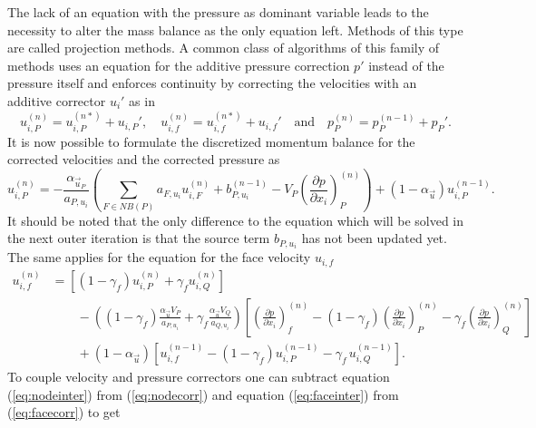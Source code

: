   The lack of an equation with the pressure as dominant variable leads to the necessity to alter the mass balance as the only equation left. Methods of this type are called projection methods. A common class of algorithms of this family of methods uses an equation for the additive pressure correction \(p'\) instead of the pressure itself and enforces continuity by correcting the velocities with an additive corrector \(u_i'\) as in
  \begin{displaymath}
    u_{i,P}^{(n)} =  u_{i,P}^{(n*)}  + u_{i,P}',\quad u_{i,f}^{(n)} =  u_{i,f}^{(n*)}  + u_{i,f}' \quad \text{and} \quad   p_P^{(n)} =  p_P^{(n-1)}  + p_P'.
  \end{displaymath}
  It is now possible to formulate the discretized momentum balance for the corrected velocities and the corrected pressure as
  \begin{equation}
    \label{eq:nodecorr}
    u_{i,P}^{(n)} 
    = 
    - \frac{\alpha_{\vec{u}_P}}{a_{P,u_i}} \left(\sum_{F \in NB(P)} a_{F,u_i} u_{i,F}^{(n)}
    +                                     b_{P,u_i}^{(n-1)} 
    -                                     V_P\left(\frac{\partial p}{\partial x_i}\right)_P^{(n)} \right)
    + \left(1 - \alpha_{\vec{u}}\right) u_{i,P}^{(n-1)}  .
  \end{equation}
  It should be noted that the only difference to the equation which will be solved in the next outer iteration is that the source term \(b_{P,u_i}\) has not been updated yet. The same applies for the equation for the face velocity \(u_{i,f}\)
  \begin{align}
    \label{eq:facecorr}
    u_{i,f}^{(n)} 
    &=
    \left[\left(1 - \gamma_f\right) u_{i,P}^{(n)} + \gamma_f u_{i,Q}^{(n)} \right] \nonumber\\[1em]
    &\quad\quad - 
    \left(\left(1 - \gamma_f\right) \frac{\alpha_\vec{u} V_P}{a_{P,u_i}} + \gamma_f \frac{\alpha_\vec{u} V_Q}{a_{Q,u_i}}\right)
    \left[ 
    \left(\frac{\partial p}{\partial x_i}\right)_f^{(n)} 
    -  \left(1 - \gamma_f\right) \left( \frac{\partial p}{\partial x_i} \right)_P^{(n)} 
    - \gamma_f \left(\frac{\partial p}{\partial x_i}\right)_Q^{(n)} 
    \right] \nonumber \\[1em]
    &\quad\quad + \left(1 - \alpha_\vec{u}\right) \left[ u_{i,f}^{(n-1)} - \left(1 - \gamma_f\right) u_{i,P}^{(n-1)} - \gamma_f \, u_{i,Q}^{(n-1)} \right].
  \end{align}
  To couple velocity and pressure correctors one can subtract equation (\ref{eq:nodeinter}) from (\ref{eq:nodecorr}) and equation (\ref{eq:faceinter}) from (\ref{eq:facecorr}) to get
